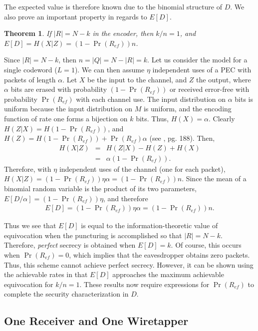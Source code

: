 \documentclass[10pt,twocolumn,twoside]{IEEEtran} \newlength{\pic}
\newtheorem{theorem}{Theorem}
\theoremstyle{definition}
\theoremstyle{remark}
\theoremstyle{plain}
\begin{document}
The expected value is therefore known due to the binomial structure of $D$. We also prove an important property in regards to $E[D]$.
\begin{theorem}\label{thm:expectedValD}
 If $|R|=N-k$ in the encoder, then $k/n = 1$, and $E[D] = H(X|Z) = (1-\Pr(R_{ef}))n$.
\end{theorem}
\begin{IEEEproof}
 Since $|R|=N-k$, then $n=|Q|=N-|R|=k$. Let us consider the model for a single codeword ($L=1$). We can then assume $\eta$ independent uses of a PEC with packets of length $\alpha$. Let $X$ be the input to the channel, and $Z$ the output, where $\alpha$ bits are erased with probability $(1-\Pr(R_{ef}))$ or received error-free with probability $\Pr(R_{ef})$ with each channel use. The input distribution on $\alpha$ bits is uniform because the input distribution on $M$ is uniform, and the encoding function of rate one forms a bijection on $k$ bits. Thus, $H(X) = \alpha$. Clearly $H(Z|X) = H(1-\Pr(R_{ef}))$, and $H(Z) = H(1-\Pr(R_{ef})) + \Pr(R_{ef})\alpha$ (see \cite{Cover}, pg. 188). Then,
 \begin{eqnarray}
  H(X|Z) &=& H(Z|X) - H(Z) + H(X)\\
  &=& \alpha(1-\Pr(R_{ef})).
 \end{eqnarray}
 Therefore, with $\eta$ independent uses of the channel (one for each packet), $H(X|Z) = (1-\Pr(R_{ef}))\eta\alpha = (1-\Pr(R_{ef}))n$. Since the mean of a binomial random variable is the product of its two parameters, $E[D/\alpha] = (1-\Pr(R_{ef}))\eta$, and therefore
 \begin{eqnarray}
  E[D] = (1-\Pr(R_{ef}))\eta\alpha = (1-\Pr(R_{ef}))n.
 \end{eqnarray}
\end{IEEEproof}
Thus we see that $E[D]$ is equal to the information-theoretic value of equivocation when the puncturing is accomplished so that $|R|=N-k$. Therefore, \emph{perfect} secrecy is obtained when $E[D] = k$. Of course, this occurs when $\Pr(R_{ef})=0$, which implies that the eavesdropper obtains zero packets. Thus, this scheme cannot achieve perfect secrecy. However, it can be shown using the achievable rates in \cite{Wyner84} that $E[D]$ approaches the maximum achievable equivocation for $k/n = 1$. These results now require expressions for $\Pr(R_{ef})$ to complete the security characterization in $D$.

\subsection{One Receiver and One Wiretapper}
\end{document}
